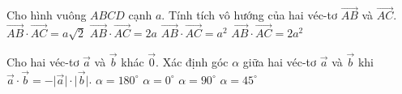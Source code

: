 \begin{ex}%
	Cho hình vuông $ABCD$ cạnh $a$. Tính tích vô hướng của hai véc-tơ $\overrightarrow{AB}$ và $\overrightarrow{AC}$.
	\choice
	{$\overrightarrow{AB}\cdot\overrightarrow{AC}=a\sqrt{2}$}
	{$\overrightarrow{AB}\cdot\overrightarrow{AC}=2a$}
	{\True $\overrightarrow{AB}\cdot\overrightarrow{AC}=a^2$}
	{$\overrightarrow{AB}\cdot\overrightarrow{AC}=2a^2$}
\end{ex}
\begin{ex}%
	Cho hai véc-tơ $\overrightarrow{a} $ và $\overrightarrow{b} $ khác $\overrightarrow{0} $. Xác định góc $\alpha $ giữa hai véc-tơ $\overrightarrow{a} $ và $\overrightarrow{b} $ khi $\overrightarrow{a} \cdot \overrightarrow{b}=-\big| \overrightarrow{a}\big| \cdot \big| \overrightarrow{b}\big| $.
	\choice
	{\True $\alpha=180^\circ $}
	{$\alpha=0^\circ $}
	{$\alpha=90^\circ $}
	{$\alpha=45^\circ $}
\end{ex}

